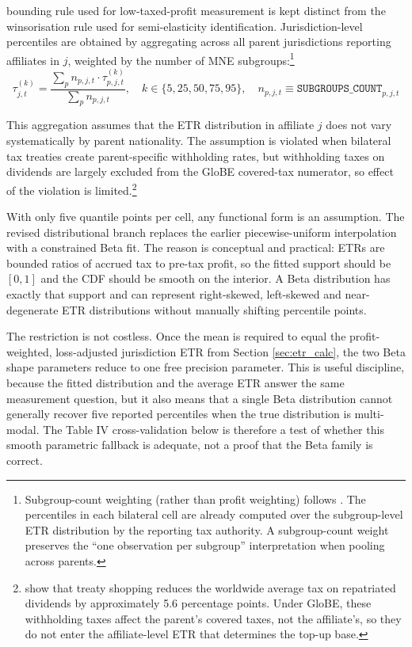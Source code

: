 \documentclass[11pt,a4paper]{article}
\newcommand{\code}[1]{\texttt{#1}}
\begin{document}
bounding rule used for low-taxed-profit measurement is kept distinct from the winsorisation rule used for semi-elasticity identification. Jurisdiction-level percentiles are obtained by aggregating across all parent jurisdictions reporting affiliates in $j$, weighted by the number of MNE subgroups:\footnote{Subgroup-count weighting (rather than profit weighting) follows \citet{hugger2026}. The percentiles in each bilateral cell are already computed over the subgroup-level ETR distribution by the reporting tax authority. A subgroup-count weight preserves the ``one observation per subgroup'' interpretation when pooling across parents.}
\begin{equation}\label{eq:jurisdiction_percentile}
\tau_{j,t}^{(k)} = \frac{\sum_p n_{p,j,t} \cdot \tau_{p,j,t}^{(k)}}{\sum_p n_{p,j,t}}, \quad k \in \{5, 25, 50, 75, 95\}, \quad n_{p,j,t} \equiv \code{SUBGROUPS\_COUNT}_{p,j,t}
\end{equation}

This aggregation assumes that the ETR distribution in affiliate $j$ does not vary systematically by parent nationality. The assumption is violated when bilateral tax treaties create parent-specific withholding rates, but withholding taxes on dividends are largely excluded from the GloBE covered-tax numerator, so effect of the violation is limited.\footnote{\citet{riet2025} show that treaty shopping reduces the worldwide average tax on repatriated dividends by approximately 5.6 percentage points. Under GloBE, these withholding taxes affect the parent's covered taxes, not the affiliate's, so they do not enter the affiliate-level ETR that determines the top-up base.}

With only five quantile points per cell, any functional form is an assumption. The revised distributional branch replaces the earlier piecewise-uniform interpolation with a constrained Beta fit. The reason is conceptual and practical: ETRs are bounded ratios of accrued tax to pre-tax profit, so the fitted support should be $[0,1]$ and the CDF should be smooth on the interior. A Beta distribution has exactly that support and can represent right-skewed, left-skewed and near-degenerate ETR distributions without manually shifting percentile points.

The restriction is not costless. Once the mean is required to equal the profit-weighted, loss-adjusted jurisdiction ETR from Section \ref{sec:etr_calc}, the two Beta shape parameters reduce to one free precision parameter. This is useful discipline, because the fitted distribution and the average ETR answer the same measurement question, but it also means that a single Beta distribution cannot generally recover five reported percentiles when the true distribution is multi-modal. The Table IV cross-validation below is therefore a test of whether this smooth parametric fallback is adequate, not a proof that the Beta family is correct.
\end{document}
